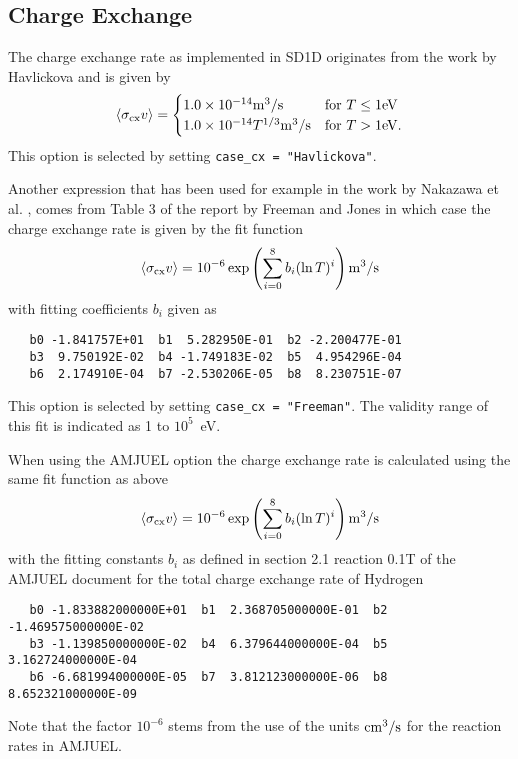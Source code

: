 \documentclass[amsmath,amssymb,a4]{revtex4-2}
\begin{document}
\subsection{Charge Exchange}

The charge exchange rate as implemented in SD1D originates from the work by Havlickova \cite{havlickova2013} and is given by \cite{SD1D}
\begin{equation}\label{charge_exchange_SD1D}
    \langle\sigma_{\rm cx} v\rangle = \begin{cases} 1.0 \times 10^{-14} {\rm m}^3/{\rm s}             & \mbox{for } T \le 1 {\rm eV} \\
                                        1.0 \times 10^{-14} T^{1/3} {\rm m}^3/{\rm s} & \mbox{for } T >   1 {\rm eV}. \end{cases}
\end{equation}
This option is selected by setting {\tt case\_cx = "Havlickova"}.

Another expression that has been used for example in the work by Nakazawa et al. \cite{nakazawa2000}, comes from Table 3 of the report by Freeman and Jones \cite{freeman1974} in which case the charge exchange rate is given by the fit function
\begin{equation}\label{charge_exchange_FJ}
    \langle\sigma_{\rm cx} v\rangle = 10^{-6} \exp\left( \sum_{i=0}^8 b_i (\ln T)^i \right)  {\rm m}^3/{\rm s}
\end{equation}
with fitting coefficients $b_i$ given as
\begin{small}\begin{verbatim}
   b0 -1.841757E+01  b1  5.282950E-01  b2 -2.200477E-01
   b3  9.750192E-02  b4 -1.749183E-02  b5  4.954296E-04
   b6  2.174910E-04  b7 -2.530206E-05  b8  8.230751E-07
\end{verbatim}\end{small}
This option is selected by setting {\tt case\_cx = "Freeman"}. The validity range of this fit is indicated as 1 to $10^5$~eV.

When using the AMJUEL option the charge exchange rate is calculated using the same fit function as above
\begin{equation}\label{charge_exchange_AMJUEL}
    \langle\sigma_{\rm cx} v\rangle = 10^{-6} \exp\left( \sum_{i=0}^8 b_i (\ln T)^i \right)  {\rm m}^3/{\rm s}
\end{equation}
with the fitting constants $b_i$ as defined in section 2.1 reaction 0.1T of the AMJUEL document for the total charge exchange rate of Hydrogen~\cite{EIRENE}
\begin{small}\begin{verbatim}
   b0 -1.833882000000E+01  b1  2.368705000000E-01  b2 -1.469575000000E-02
   b3 -1.139850000000E-02  b4  6.379644000000E-04  b5  3.162724000000E-04
   b6 -6.681994000000E-05  b7  3.812123000000E-06  b8  8.652321000000E-09
\end{verbatim}\end{small}
Note that the factor $10^{-6}$ stems from the use of the units ${\rm cm}^3/{\rm s}$ for the reaction rates in AMJUEL.
\end{document}
